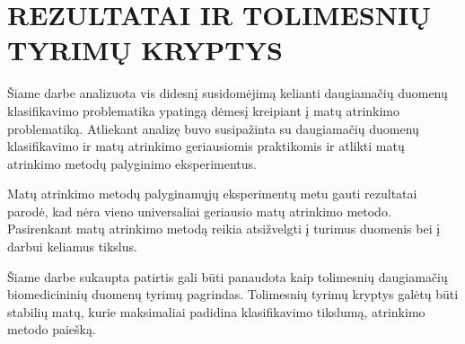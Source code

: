
\section*{REZULTATAI IR TOLIMESNIŲ TYRIMŲ KRYPTYS}

Šiame darbe analizuota vis didesnį susidomėjimą kelianti daugiamačių duomenų klasifikavimo problematika ypatingą dėmesį kreipiant į matų atrinkimo problematiką. Atliekant analizę buvo susipažinta su daugiamačių duomenų klasifikavimo ir matų atrinkimo geriausiomis praktikomis ir atlikti matų atrinkimo metodų palyginimo eksperimentus.



Matų atrinkimo metodų palyginamųjų eksperimentų metu gauti rezultatai parodė, kad nėra vieno universaliai geriausio matų atrinkimo metodo. Pasirenkant matų atrinkimo metodą reikia atsižvelgti į turimus duomenis bei į darbui keliamus tikslus. 

Šiame darbe sukaupta patirtis gali būti panaudota kaip tolimesnių daugiamačių biomedicininių duomenų tyrimų pagrindas. Tolimesnių tyrimų kryptys galėtų būti stabilių matų, kurie maksimaliai padidina klasifikavimo tikslumą, atrinkimo metodo paiešką.
